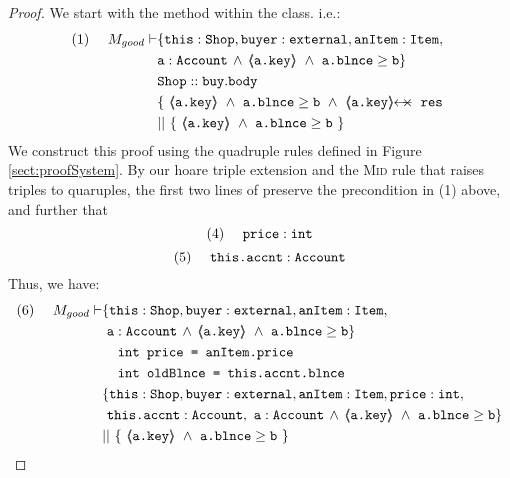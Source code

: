 \begin{proof}
We start with the  method within the  class. i.e.:
\small
\begin{align*}
\text{(1)}  \ \ \ \ M_{good} \vdash 
		&	\{  \prg{this}:\prg{Shop}, \prg{buyer} : \prg{external}, 
		\prg{anItem} : \prg{Item},\\
		& \prg{a}:\prg{Account}\, \wedge\, {\inside{\prg{a.key}}}\ \wedge\ {\prg{a.blnce} \geq \prg{b}}\} \\
		& \prg{Shop}::\prg{buy}.\prg{body}\ \\ 
		& \{\ {\inside{\prg{a.key}}\ \wedge\ {\prg{a.blnce} \geq \prg{b}}}\ 
		\wedge\ {\protectedFrom{\prg{a.key}}{\prg{res}}}\ \\
		& ||\ \{\ {\inside{\prg{a.key}}\ \wedge\ 
							 {\prg{a.blnce} \geq \prg{b}}}\ \}
\end{align*}
\normalsize
We construct this proof using the quadruple rules defined in Figure \ref{sect:proofSystem}. By our hoare triple extension and the \textsc{Mid} rule that raises triples to quaruples, the first two lines
of \prg{buy} preserve the precondition in (1) above, and further that 
\small
$$
\text{(4)} \ \ \ \ \mbox{\normalfont{\texttt{price}}} : \mbox{\normalfont{\texttt{int}}}
$$ 
$$
\text{(5)} \ \ \ \ \prg{this.accnt} : \prg{Account}
$$ 
\normalsize
Thus, we have:
\small
\begin{align*}
\text{(6)}  \ \ \ \ M_{good} \vdash 
		&	\{  \prg{this}:\prg{Shop}, \prg{buyer} : \prg{external}, 
		\prg{anItem} : \prg{Item},\\
		&\  \prg{a}:\prg{Account}\, \wedge\, {\inside{\prg{a.key}}}\ \wedge\ {\prg{a.blnce} \geq \prg{b}}\} \\
		&\; \; \; \; \prg{int price = anItem.price} \\ 
		&\; \; \; \; \prg{int oldBlnce = this.accnt.blnce} \\
		&\{  \prg{this}:\prg{Shop}, \prg{buyer} : \prg{external}, 
		\prg{anItem} : \prg{Item}, \prg{price} : \prg{int}, \\
		& \ \prg{this.accnt} : \prg{Account},\  \prg{a}:\prg{Account}\, \wedge\, {\inside{\prg{a.key}}}\ \wedge\ {\prg{a.blnce} \geq \prg{b}}\} \\
		& ||\ \{\ {\inside{\prg{a.key}}\ \wedge\ 
							 {\prg{a.blnce} \geq \prg{b}}}\ \}
\end{align*}
\normalsize



\end{proof}
